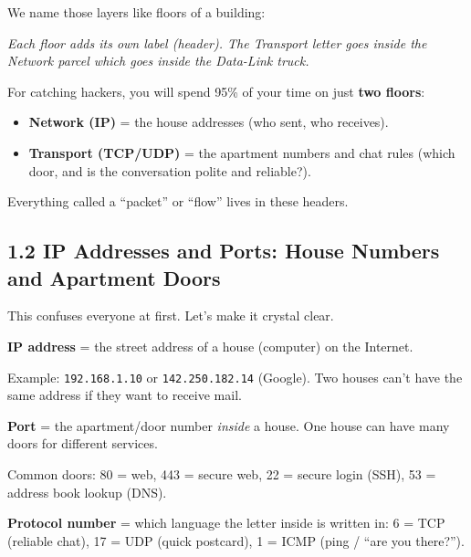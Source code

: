 \documentclass[11pt,a4paper]{article}
\begin{document}
We name those layers like floors of a building:

\begin{center}
\end{center}
\noindent\emph{Each floor adds its own label (header). The Transport letter goes
inside the Network parcel which goes inside the Data-Link truck.}

\begin{keybox}
For catching hackers, you will spend 95\% of your time on just \textbf{two
floors}:
\begin{itemize}[leftmargin=1.6em,itemsep=1pt]
  \item \textbf{Network (IP)} = the house addresses (who sent, who receives).
  \item \textbf{Transport (TCP/UDP)} = the apartment numbers and chat rules
        (which door, and is the conversation polite and reliable?).
\end{itemize}
Everything called a ``packet'' or ``flow'' lives in these headers.
\end{keybox}

\subsection{1.2 IP Addresses and Ports: House Numbers and Apartment Doors}
\label{sec:addresses}

This confuses everyone at first. Let's make it crystal clear.

\begin{jargonbox}
\textbf{IP address} = the street address of a house (computer) on the Internet.

Example: \texttt{192.168.1.10} or \texttt{142.250.182.14} (Google). Two houses
can't have the same address if they want to receive mail.

\textbf{Port} = the apartment/door number \emph{inside} a house. One house can
have many doors for different services.

Common doors: 80 = web, 443 = secure web, 22 = secure login (SSH), 53 = address
book lookup (DNS).

\textbf{Protocol number} = which language the letter inside is written in:
6 = TCP (reliable chat), 17 = UDP (quick postcard), 1 = ICMP (ping / ``are you
there?'').
\end{jargonbox}
\end{document}
